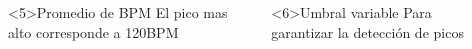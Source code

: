 \documentclass[slidestop,compress,mathserif,xcolor=svgnames,table,xcolor=dvipsnames]{beamer}
\begin{document}
\begin{frame}
\begin{columns}
\begin{scriptsize}


\end{scriptsize}

\vspace*{-20pt}
\begin{block}<5>{Promedio de BPM}
El pico mas alto corresponde a 120BPM
\end{block}

\vspace*{-44pt}
\begin{block}<6>{Umbral variable}
Para garantizar la detección de picos
\end{block}

\end{columns}

\end{frame}
\end{document}
